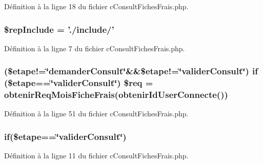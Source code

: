 Définition à la ligne 18 du fichier c\-Consult\-Fiches\-Frais.\-php.

\hypertarget{c_consult_fiches_frais_8php_aad2a80747c2de66b59cb18d493ae7a8b}{
\subsubsection[{\$rep\-Include}]{\setlength{\rightskip}{0pt plus 5cm}\$rep\-Include = './include/'}}\label{c_consult_fiches_frais_8php_aad2a80747c2de66b59cb18d493ae7a8b}


Définition à la ligne 7 du fichier c\-Consult\-Fiches\-Frais.\-php.

\hypertarget{c_consult_fiches_frais_8php_aa8307f98fa28d7f64c9762e7986440b6}{
\subsubsection[{\$req}]{ (\$etape!=\char`\"{}demander\-Consult\char`\"{}\&\&\$etape!=\char`\"{}valider\-Consult\char`\"{}) if (\$etape==\char`\"{}valider\-Consult\char`\"{}) \$req = {\bf obtenir\-Req\-Mois\-Fiche\-Frais}({\bf obtenir\-Id\-User\-Connecte}())}}\label{c_consult_fiches_frais_8php_aa8307f98fa28d7f64c9762e7986440b6}


Définition à la ligne 51 du fichier c\-Consult\-Fiches\-Frais.\-php.

\hypertarget{c_consult_fiches_frais_8php_a12d9ecce0abd3757dd699cc19040e747}{
\subsubsection[{if}]{\setlength{\rightskip}{0pt plus 5cm}if(\$etape==\char`\"{}valider\-Consult\char`\"{})}}\label{c_consult_fiches_frais_8php_a12d9ecce0abd3757dd699cc19040e747}


Définition à la ligne 11 du fichier c\-Consult\-Fiches\-Frais.\-php.

